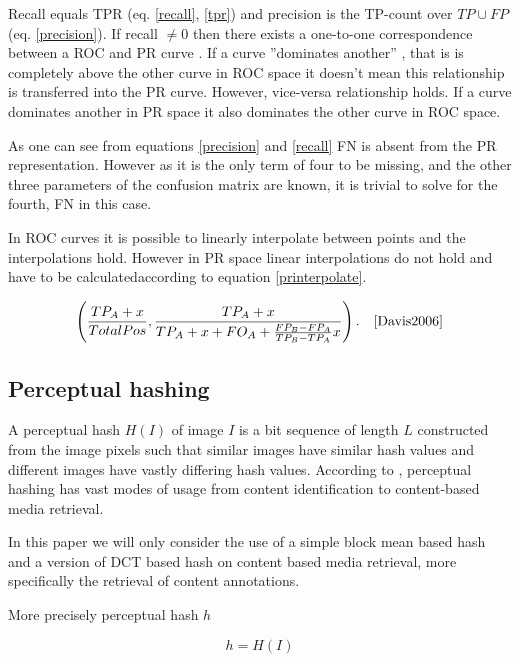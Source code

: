 \documentclass[english,12pt,a4paper,pdftex,elec,utf8]{aaltothesis}
\begin{document}
Recall equals TPR (eq. \ref{recall}, \ref{tpr}) and precision is the TP-count over $TP \cup FP$ (eq. \ref{precision}). If recall $\neq 0$ then there exists a one-to-one correspondence between a ROC and PR curve \cite{Davis2006}. If a curve ''dominates another'' \cite{Provost1997}, that is is completely above the other curve in ROC space it doesn't mean this relationship is transferred into the PR curve. However, vice-versa relationship holds. If a curve dominates another in PR space it also dominates the other curve in ROC space. \cite{Davis2006}

As one can see from equations \ref{precision} and \ref{recall} FN is absent from the PR representation. However as it is the only term of four to be missing, and the other three parameters of the confusion matrix are known, it is trivial to solve for the fourth, FN in this case. \cite{Davis2006}

In ROC curves it is possible to linearly interpolate between points and the interpolations hold. However in PR space linear interpolations do not hold and have to be calculatedaccording to equation \ref{printerpolate}. \cite{Davies200}

\begin{equation}\label{printerpolate}
\left(\frac{TP_A+x}{Total Pos}, \frac{TP_A+x}{TP_A+x+FO_A+ \frac{FP_B-FP_A}{TP_B-TP_A}x} \right). \quad \cite{Davis2006}
\end{equation}

\subsection{Perceptual hashing} \label{perceptualhash}
A perceptual hash $H(I)$ of image $I$ is a bit sequence of length $L$ constructed from the image pixels such that similar images have similar hash values and different images have vastly differing hash values. According to \cite{Zauner2010}, perceptual hashing has vast modes of usage from content identification to content-based media retrieval.

In this paper we will only consider the use of a simple block mean based hash and a version of DCT based hash on content based media retrieval, more specifically the retrieval of content annotations.

More precisely perceptual hash $h$

\begin{equation}\label{hashfunction}
h = H(I)
\end{equation}
\end{document}
